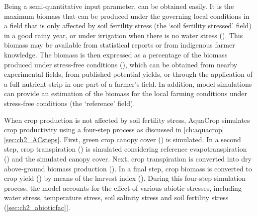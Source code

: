 Being a semi-quantitative input parameter, \Brel can be obtained easily. It is the maximum biomass that can be produced under the governing local conditions in a field that is only affected by soil fertility stress (the `soil fertility stressed' field) in a good rainy year, or under irrigation when there is no water stress (\Bstress). This biomass may be available from statistical reports or from indigenous farmer knowledge. The biomass is then expressed as a percentage of the biomass produced under stress-free conditions (\Bref), which can be obtained from nearby experimental fields, from published potential yields, or through the application of a full nutrient strip in one part of a farmer's field. In addition, model simulations can provide an estimation of the biomass for the local farming conditions under stress-free conditions (the `reference' field). 

When crop production is not affected by soil fertility stress, AquaCrop simulates crop productivity using a four-step process as discussed in \autoref{ch:aquacrop} \autoref{sec:ch2_ACsteps}. First, green crop canopy cover (\CC) is simulated. In a second step, crop transpiration (\Tr) is simulated considering reference evapotranspiration (\ETo) and the simulated canopy cover. Next, crop transpiration is converted into dry above-ground biomass production (\B). In a final step, crop biomass is converted to crop yield (\Y) by means of the harvest index (\HI). During this four-step simulation process, the model accounts for the effect of various abiotic stresses, including water stress, temperature stress, soil salinity stress and soil fertility stress (\autoref{sec:ch2_abioticfac}). 

